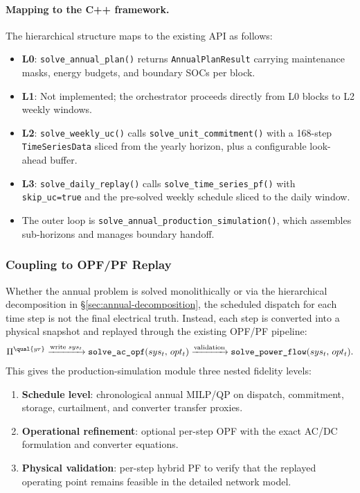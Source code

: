 \paragraph{Mapping to the C++ framework.}
The hierarchical structure maps to the existing API as follows:
\begin{itemize}
\item \textbf{L0}: \texttt{solve\_annual\_plan()} returns \texttt{AnnualPlanResult} carrying
  maintenance masks, energy budgets, and boundary SOCs per block.
\item \textbf{L1}: Not implemented; the orchestrator proceeds directly from L0
  blocks to L2 weekly windows.
\item \textbf{L2}: \texttt{solve\_weekly\_uc()} calls \texttt{solve\_unit\_commitment()} with a
  168-step \texttt{TimeSeriesData} sliced from the yearly horizon, plus a
  configurable look-ahead buffer.
\item \textbf{L3}: \texttt{solve\_daily\_replay()} calls \texttt{solve\_time\_series\_pf()} with
  \texttt{skip\_uc=true} and the pre-solved weekly schedule sliced to the
  daily window.
\item The outer loop is \texttt{solve\_annual\_production\_simulation()}, which
  assembles sub-horizons and manages boundary handoff.
\end{itemize}

\subsubsection{Coupling to OPF/PF Replay}
\label{sec:annual-replay}

Whether the annual problem is solved monolithically or via the hierarchical
decomposition in \S\ref{sec:annual-decomposition}, the scheduled dispatch for
each time step is not the final electrical truth.  Instead, each step is
converted into a physical snapshot and replayed through the existing OPF/PF
pipeline:
\begin{align}
\Pi^{\qual{yr}}
\xrightarrow{\text{write } sys_t}
\texttt{solve\_ac\_opf}(sys_t,\,opt_t)
\xrightarrow{\text{validation}}
\texttt{solve\_power\_flow}(sys_t,\,opt_t).
\label{eq:annual-replay-pipeline}
\end{align}
This gives the production-simulation module three nested fidelity levels:
\begin{enumerate}
\item \textbf{Schedule level}: chronological annual MILP/QP on dispatch,
  commitment, storage, curtailment, and converter transfer proxies.
\item \textbf{Operational refinement}: optional per-step OPF with the exact
  AC/DC formulation and converter equations.
\item \textbf{Physical validation}: per-step hybrid PF to verify that the
  replayed operating point remains feasible in the detailed network model.
\end{enumerate}

